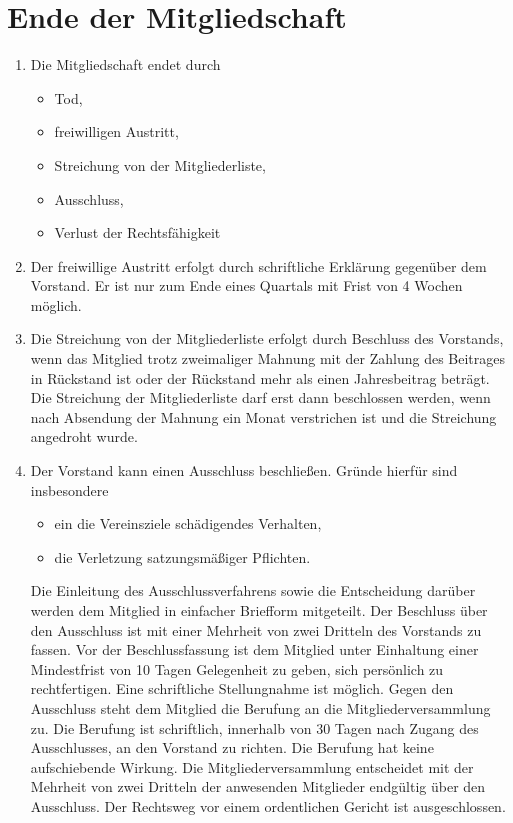 \documentclass[12pt]{article}
\begin{document}
\section{Ende der Mitgliedschaft}
\begin{enumerate}[label=(\arabic*)]
	\item Die Mitgliedschaft endet durch
	      \begin{itemize}
		      \item Tod,
		      \item freiwilligen Austritt,
		      \item Streichung von der Mitgliederliste,
		      \item Ausschluss,
		      \item Verlust der Rechtsfähigkeit
	      \end{itemize}
	\item Der freiwillige Austritt erfolgt durch schriftliche Erklärung gegenüber dem Vorstand. Er ist nur zum
	      Ende eines Quartals mit Frist von 4 Wochen möglich.
	\item Die Streichung von der Mitgliederliste erfolgt durch Beschluss des Vorstands, wenn das Mitglied
	      trotz zweimaliger Mahnung mit der Zahlung des Beitrages in Rückstand ist oder der Rückstand mehr
	      als einen Jahresbeitrag beträgt. Die Streichung der Mitgliederliste darf erst dann beschlossen
	      werden, wenn nach Absendung der Mahnung ein Monat verstrichen ist und die Streichung angedroht
	      wurde.
	\item Der Vorstand kann einen Ausschluss beschließen.
	      Gründe hierfür sind insbesondere
	      \begin{itemize}
		      \item ein die Vereinsziele schädigendes Verhalten,
		      \item die Verletzung satzungsmäßiger Pflichten.
	      \end{itemize}
	      Die Einleitung des Ausschlussverfahrens sowie die Entscheidung darüber werden dem Mitglied in
	      einfacher Briefform mitgeteilt. Der Beschluss über den Ausschluss ist mit einer Mehrheit von zwei
	      Dritteln des Vorstands zu fassen. Vor der Beschlussfassung ist dem Mitglied unter Einhaltung einer
	      Mindestfrist von 10 Tagen Gelegenheit zu geben, sich persönlich zu rechtfertigen. Eine schriftliche
	      Stellungnahme ist möglich.
	      Gegen den Ausschluss steht dem Mitglied die Berufung an die Mitgliederversammlung zu. Die
	      Berufung ist schriftlich, innerhalb von 30 Tagen nach Zugang des Ausschlusses, an den Vorstand zu
	      richten. Die Berufung hat keine aufschiebende Wirkung. Die Mitgliederversammlung entscheidet mit
	      der Mehrheit von zwei Dritteln der anwesenden Mitglieder endgültig über den Ausschluss. Der
	      Rechtsweg vor einem ordentlichen Gericht ist ausgeschlossen.
\end{enumerate}
\end{document}
